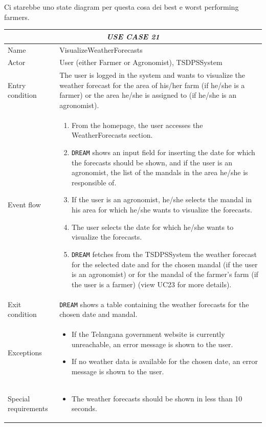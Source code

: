 \documentclass{article}
\begin{document}
\color{red}
Ci starebbe uno state diagram per questa cosa dei best e worst performing farmers.
\color{black}


\centering
\begin{longtable}{|p{3.5cm}|m{8cm}|}
 \hline
 \multicolumn{2}{|c|}{\cellcolor{white}\emph{USE CASE 21}} \\
 \endfirsthead
 \endhead
 \endfoot
 \endlastfoot
 \hline
 Name & VisualizeWeatherForecasts\\
 \hline
 Actor & User (either Farmer or Agronomist), TSDPSSystem \\
 \hline
 Entry condition & The user is logged in the system and wants to visualize the weather forecast for the area of his/her farm (if he/she is a farmer) or the area he/she is assigned to (if he/she is an agronomist).\\
 \hline
 Event flow & \begin{enumerate}
    \item From the homepage, the user accesses the WeatherForecasts section.
    \item \verb|DREAM| shows an input field for inserting the date for which the forecasts should be shown, and if the user is an agronomist, the list of the mandals in the area he/she is responsible of.
    \item If the user is an agronomist, he/she selects the mandal in his area for which he/she wants to visualize the forecasts. 
    \item The user selects the date for which he/she wants to visualize the forecasts.
    \item \verb|DREAM| fetches from the TSDPSSystem the weather forecast for the selected date and for the chosen mandal (if the user is an agronomist) or for the mandal of the farmer's farm (if the user is a farmer) (view UC23 for more details).
 \end{enumerate}\\
 \hline
 Exit condition & \verb|DREAM| shows a table containing the weather forecasts for the chosen date and mandal. \\
 \hline
 Exceptions & \begin{itemize}
     \item If the Telangana government website is currently unreachable, an error message is shown to the user.
     \item If no weather data is available for the chosen date, an error message is shown to the user.
 \end{itemize}\\
 \hline
 Special requirements &\begin{itemize}
     \item The weather forecasts should be shown in less than 10 seconds.
 \end{itemize}\\
 \hline
\end{longtable}
\end{document}
